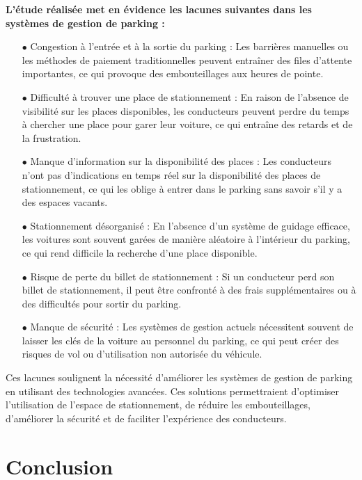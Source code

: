   
\textbf{L'étude réalisée met en évidence les lacunes suivantes dans les systèmes de gestion de parking :}
\begin{enumerate}
   \item [$\bullet$] Congestion à l'entrée et à la sortie du parking : Les barrières manuelles ou les méthodes de paiement traditionnelles peuvent entraîner des files d'attente importantes, ce qui provoque des embouteillages aux heures de pointe.
   \item [$\bullet$] Difficulté à trouver une place de stationnement : En raison de l'absence de visibilité sur les places disponibles, les conducteurs peuvent perdre du temps à chercher une place pour garer leur voiture, ce qui entraîne des retards et de la frustration.
   \item [$\bullet$] Manque d'information sur la disponibilité des places : Les conducteurs n'ont pas d'indications en temps réel sur la disponibilité des places de stationnement, ce qui les oblige à entrer dans le parking sans savoir s'il y a des espaces vacants.
   \item [$\bullet$] Stationnement désorganisé : En l'absence d'un système de guidage efficace, les voitures sont souvent garées de manière aléatoire à l'intérieur du parking, ce qui rend difficile la recherche d'une place disponible.
   \item [$\bullet$] Risque de perte du billet de stationnement : Si un conducteur perd son billet de stationnement, il peut être confronté à des frais supplémentaires ou à des difficultés pour sortir du parking.
   \item [$\bullet$] Manque de sécurité : Les systèmes de gestion actuels nécessitent souvent de laisser les clés de la voiture au personnel du parking, ce qui peut créer des risques de vol ou d'utilisation non autorisée du véhicule.
\end{enumerate}
Ces lacunes soulignent la nécessité d'améliorer les systèmes de gestion de parking en utilisant des technologies avancées. Ces solutions permettraient d'optimiser l'utilisation de l'espace de stationnement, de réduire les embouteillages, d'améliorer la sécurité et de faciliter l'expérience des conducteurs.

\section{Conclusion}

